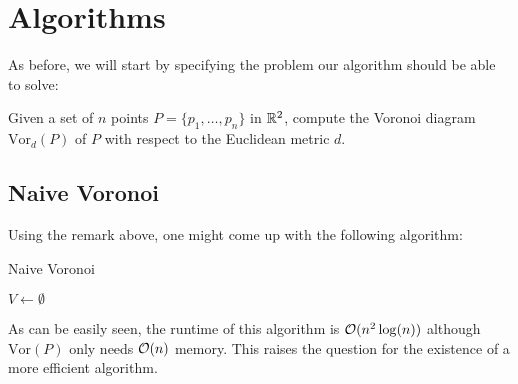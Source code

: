 \section{Algorithms}
    As before, we will start by specifying the problem our algorithm should be able to solve:
    \begin{mdframed}
        Given a set of $n$ points $P = \{p_1, \dots, p_n\}$ in $\mathbb{R}^2$, compute the Voronoi diagram $\text{Vor}_d(P)$ of $P$ with respect to the Euclidean metric $d$. 
    \end{mdframed}

    \subsection{Naive Voronoi}
        Using the remark above, one might come up with the following algorithm:

        \begin{breakablealgorithm}
            \caption{Naive Voronoi}
            \label{alg:naive_voronoi}
            \begin{algorithmic}[1]
                    \State $V \gets \emptyset$
                     
                         
                            \EndIf
                        \EndFor
                    \EndFor
                    \State{}
                \EndProcedure
            \end{algorithmic}
        \end{breakablealgorithm}

        As can be easily seen, the runtime of this algorithm is $\mathcal{O}(n^2\log(n))$ although $\text{Vor}(P)$ only needs $\mathcal{O}(n)$ memory. This raises the question for the existence of a more efficient algorithm. 

